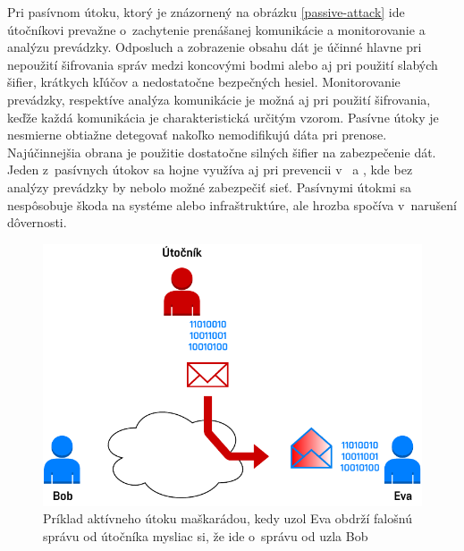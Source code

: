 Pri pasívnom útoku, ktorý je znázornený na obrázku \ref{passive-attack} ide útočníkovi prevažne o~zachytenie prenášanej komunikácie a monitorovanie a  analýzu prevádzky. Odposluch a zobrazenie obsahu dát je účinné hlavne pri nepoužití šifrovania správ medzi koncovými bodmi alebo aj pri použití slabých šifier, krátkych kľúčov a nedostatočne bezpečných hesiel. Monitorovanie prevádzky, respektíve analýza komunikácie je možná aj pri použití šifrovania, keďže každá komunikácia je charakteristická určitým vzorom. Pasívne útoky je nesmierne obtiažne detegovať nakoľko nemodifikujú dáta pri prenose. Najúčinnejšia obrana je použitie dostatočne silných šifier na zabezpečenie dát. Jeden z~pasívnych útokov sa hojne využíva aj pri prevencii v~ a , kde bez analýzy prevádzky by nebolo možné zabezpečiť sieť. Pasívnymi útokmi sa nespôsobuje škoda na systéme alebo infraštruktúre, ale hrozba spočíva v~narušení dôvernosti.

\begin{figure}[H]
	\begin{center}
		\includegraphics[scale=0.55]{obrazky/active-attack-masq.pdf}
	\end{center}
	\caption[Aktívny útok maškaráda]{Príklad aktívneho útoku maškarádou, kedy uzol Eva obdrží falošnú správu od útočníka mysliac si, že ide o~správu od uzla Bob \cite{Stallings2011}}
	\label{active-attack-masq}
\end{figure}

